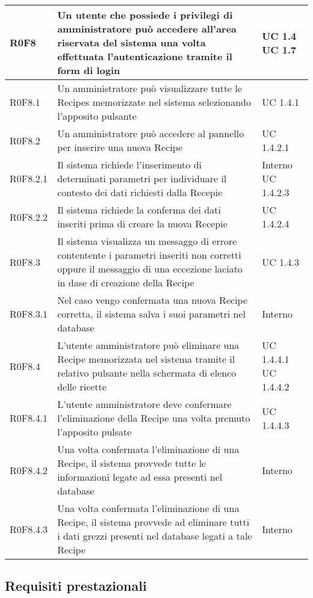 \begin{center}
\begin{longtable}{| p{2cm} | p{8cm} | p{2cm} |}
		\hline
		R0F8  &  Un utente che possiede i privilegi di amministratore può accedere all'area riservata del sistema una volta effettuata l'autenticazione tramite il form di login  &  UC 1.4 \newline UC 1.7 \\
		\hline
		R0F8.1  &  Un amministratore può visualizzare tutte le Recipes memorizzate nel sistema selezionando l'apposito pulsante  &  UC 1.4.1 \\
		\hline
		R0F8.2  &  Un amministratore può accedere al pannello per inserire una nuova Recipe  &  UC 1.4.2.1 \\
		\hline
		R0F8.2.1  &  Il sistema richiede l'inserimento di determinati parametri per individuare il contesto dei dati richiesti dalla Recepie  &  Interno \newline UC 1.4.2.3 \\
		\hline
		R0F8.2.2  &  Il sistema richiede la conferma dei dati inseriti prima di creare la nuova Recepie  &  UC 1.4.2.4 \\
		\hline
		R0F8.3  &  Il sistema visualizza un messaggo di errore contentente i parametri inseriti non corretti oppure il messaggio di una eccezione laciato in dase di creazione della Recipe  &  UC 1.4.3 \\
		\hline
		R0F8.3.1  &  Nel caso vengo confermata  una nuova Recipe corretta, il sistema salva i suoi parametri nel database  &  Interno \\
		\hline
		R0F8.4  &  L'utente amministratore può eliminare una Recipe memorizzata nel sistema tramite il relativo pulsante nella schermata di elenco delle ricette  &  UC 1.4.4.1 \newline UC 1.4.4.2 \\
		\hline
		R0F8.4.1  &  L'utente amministratore deve confermare l'eliminazione della Recipe una volta premuto l'apposito pulsate  &  UC 1.4.4.3 \\
		\hline
		R0F8.4.2  &  Una volta confermata l'eliminazione di una Recipe, il sistema provvede tutte le informazioni legate ad essa presenti nel database  &  Interno \\
		\hline
		R0F8.4.3  &  Una volta confermata l'eliminazione di una Recipe, il sistema provvede ad eliminare tutti i dati grezzi presenti nel database legati a tale Recipe  &  Interno \\
		\hline


	\end{longtable}
	\egroup
\end{center}


\subsection{Requisiti prestazionali}

